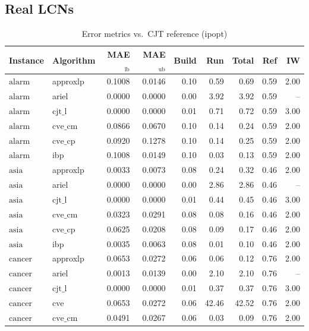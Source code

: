 \documentclass{article}
\begin{document}
\subsection{Real LCNs}
\begin{table}[ht]
\centering
\caption{Error metrics vs.\ CJT reference (ipopt)}
\begin{tabular}{llrrrrrrr}
\toprule
Instance & Algorithm & MAE$_{\text{lb}}$ & MAE$_{\text{ub}}$ & Build & Run & Total & Ref & IW \\
\midrule
$\text{alarm}$ & approxlp & 0.1008 & 0.0146 & 0.10 & 0.59 & 0.69 & 0.59 & 2.00 \\
$\text{alarm}$ & ariel & 0.0000 & 0.0000 & 0.00 & 3.92 & 3.92 & 0.59 & -- \\
$\text{alarm}$ & $\text{cjt\_l}$ & 0.0000 & 0.0000 & 0.01 & 0.71 & 0.72 & 0.59 & 3.00 \\
$\text{alarm}$ & $\text{cve\_cm}$ & 0.0866 & 0.0670 & 0.10 & 0.14 & 0.24 & 0.59 & 2.00 \\
$\text{alarm}$ & $\text{cve\_cp}$ & 0.0920 & 0.1278 & 0.10 & 0.14 & 0.25 & 0.59 & 2.00 \\
$\text{alarm}$ & ibp & 0.1008 & 0.0149 & 0.10 & 0.03 & 0.13 & 0.59 & 2.00 \\
\hline
$\text{asia}$ & approxlp & 0.0033 & 0.0073 & 0.08 & 0.24 & 0.32 & 0.46 & 2.00 \\
$\text{asia}$ & ariel & 0.0000 & 0.0000 & 0.00 & 2.86 & 2.86 & 0.46 & -- \\
$\text{asia}$ & $\text{cjt\_l}$ & 0.0000 & 0.0000 & 0.01 & 0.44 & 0.45 & 0.46 & 3.00 \\
$\text{asia}$ & $\text{cve\_cm}$ & 0.0323 & 0.0291 & 0.08 & 0.08 & 0.16 & 0.46 & 2.00 \\
$\text{asia}$ & $\text{cve\_cp}$ & 0.0625 & 0.0208 & 0.08 & 0.09 & 0.17 & 0.46 & 2.00 \\
$\text{asia}$ & ibp & 0.0035 & 0.0063 & 0.08 & 0.01 & 0.10 & 0.46 & 2.00 \\
\hline
$\text{cancer}$ & approxlp & 0.0653 & 0.0272 & 0.06 & 0.06 & 0.12 & 0.76 & 2.00 \\
$\text{cancer}$ & ariel & 0.0013 & 0.0139 & 0.00 & 2.10 & 2.10 & 0.76 & -- \\
$\text{cancer}$ & $\text{cjt\_l}$ & 0.0000 & 0.0000 & 0.01 & 0.37 & 0.37 & 0.76 & 3.00 \\
$\text{cancer}$ & cve & 0.0653 & 0.0272 & 0.06 & 42.46 & 42.52 & 0.76 & 2.00 \\
$\text{cancer}$ & $\text{cve\_cm}$ & 0.0491 & 0.0267 & 0.06 & 0.03 & 0.09 & 0.76 & 2.00 \\

\end{tabular}
\end{table}
\end{document}
